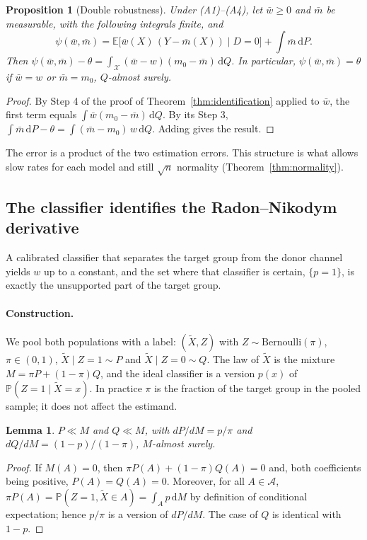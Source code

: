 \documentclass[11pt,a4paper]{article}
\newcommand{\E}{\mathbb{E}}
\newcommand{\PP}{\mathbb{P}}
\newcommand{\X}{\mathcal{X}}
\newcommand{\A}{\mathcal{A}}
\newcommand{\dd}{\,\mathrm{d}}
\theoremstyle{plain}
\newtheorem{proposition}{Proposition}
\newtheorem{lemma}{Lemma}
\theoremstyle{definition}
\begin{document}
\begin{proposition}[Double robustness]\label{prop:dr}
Under (A1)--(A4), let $\bar w\ge0$ and $\bar m$ be measurable, with the following integrals finite, and
\[
\psi(\bar w,\bar m)=\E\bigl[\bar w(X)\,(Y-\bar m(X))\mid D=0\bigr]+\int\bar m\dd P .
\]
Then $\psi(\bar w,\bar m)-\theta=\int_\X(\bar w-w)(m_0-\bar m)\dd Q$. In particular, $\psi(\bar w,\bar m)=\theta$ if $\bar w=w$ or $\bar m=m_0$, $Q$-almost surely.
\end{proposition}
\begin{proof}
By Step 4 of the proof of Theorem~\ref{thm:identification} applied to $\bar w$, the first term equals $\int\bar w(m_0-\bar m)\dd Q$. By its Step 3, $\int\bar m\dd P-\theta=\int(\bar m-m_0)\,w\dd Q$. Adding gives the result.
\end{proof}

The error is a product of the two estimation errors. This structure is what allows slow rates for each model and still $\sqrt n$ normality (Theorem~\ref{thm:normality}).
\subsection{The classifier identifies the Radon--Nikodym derivative}\label{sec:classifier}

A calibrated classifier that separates the target group from the donor channel yields $w$ up to a constant, and the set where that classifier is certain, $\{p=1\}$, is exactly the unsupported part of the target group.

\paragraph{Construction.} We pool both populations with a label: $(\tilde X,Z)$ with $Z\sim\mathrm{Bernoulli}(\pi)$, $\pi\in(0,1)$, $\tilde X\mid Z=1\sim P$ and $\tilde X\mid Z=0\sim Q$. The law of $\tilde X$ is the mixture $M=\pi P+(1-\pi)Q$, and the ideal classifier is a version $p(x)$ of $\PP(Z=1\mid\tilde X=x)$. In practice $\pi$ is the fraction of the target group in the pooled sample; it does not affect the estimand.

\begin{lemma}\label{lem:mixture}
$P\ll M$ and $Q\ll M$, with $dP/dM=p/\pi$ and $dQ/dM=(1-p)/(1-\pi)$, $M$-almost surely.
\end{lemma}
\begin{proof}
If $M(A)=0$, then $\pi P(A)+(1-\pi)Q(A)=0$ and, both coefficients being positive, $P(A)=Q(A)=0$. Moreover, for all $A\in\A$, $\pi P(A)=\PP(Z=1,\tilde X\in A)=\int_A p\dd M$ by definition of conditional expectation; hence $p/\pi$ is a version of $dP/dM$. The case of $Q$ is identical with $1-p$.
\end{proof}
\end{document}
